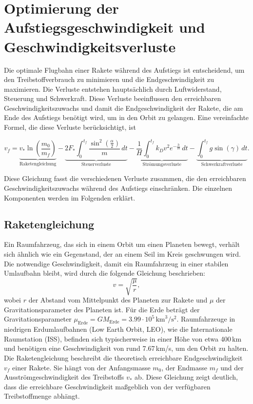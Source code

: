 %
%
%
%

\section{Optimierung der Aufstiegsgeschwindigkeit und Geschwindigkeitsverluste \label{leo:section:aufstiegsgleichung}}

Die optimale Flugbahn einer Rakete während des Aufstiegs ist entscheidend, um den Treibstoffverbrauch zu minimieren und die Endgeschwindigkeit zu maximieren. 
Die Verluste entstehen hauptsächlich durch Luftwiderstand, Steuerung und Schwerkraft. 
Diese Verluste beeinflussen den erreichbaren Geschwindigkeitszuwachs und damit die Endgeschwindigkeit der Rakete, die am Ende des Aufstiegs benötigt wird, um in den Orbit zu gelangen. 
Eine vereinfachte Formel, die diese Verluste berücksichtigt, ist

\begin{equation}
	v_f = \underbrace{v_* \ln \left(\frac{m_0}{m_f}\right)}_{\text{Raketengleichung}} 
	- \underbrace{2F_* \int_0^{t_f} \frac{\sin^2\left(\frac{\alpha}{2}\right)}{m} \, dt }_{\text{Steuerverluste}}
	- \underbrace{\frac{1}{H} \int_0^{t_f} k_Dv^2 e^{-\frac{h}{H}} \, dt }_{\text{Strömungsverluste}}
	- \underbrace{\int_0^{t_f} g \sin \left(\gamma\right) \, dt}_{\text{Schwerkraftverluste}}.
	\label{leo:aufstiegsgleichung}
\end{equation}

Diese Gleichung fasst die verschiedenen Verluste zusammen, die den erreichbaren Geschwindigkeitszuwachs während des Aufstiegs einschränken. 
Die einzelnen Komponenten werden im Folgenden erklärt.

\subsection{Raketengleichung \label{leo:section:raketengleichung}}
Ein Raumfahrzeug, das sich in einem Orbit um einen Planeten bewegt, verhält sich ähnlich wie ein Gegenstand, der an einem Seil im Kreis geschwungen wird. 
Die notwendige Geschwindigkeit, damit ein Raumfahrzeug in einer stabilen Umlaufbahn bleibt, wird durch die folgende Gleichung beschrieben:
\[
v = \sqrt{\frac{\mu}{r}},
\]
wobei \(r\) der Abstand vom Mittelpunkt des Planeten zur Rakete und \(\mu\) der Gravitationsparameter des Planeten ist.
Für die Erde beträgt der Gravitationsparameter $\mu_{\text{Erde}} = GM_{\text{Erde}} = 3.99 \cdot 10^5\,\text{km}^3/\text{s}^2$. 
Raumfahrzeuge in niedrigen Erdumlaufbahnen (Low Earth Orbit, LEO), wie die Internationale Raumstation (ISS), befinden sich typischerweise in einer Höhe von etwa 400\,km und benötigen eine Geschwindigkeit von rund 7.67\,km/s, um den Orbit zu halten.
Die Raketengleichung beschreibt die theoretisch erreichbare Endgeschwindigkeit \(v_f\) einer Rakete. 
Sie hängt von der Anfangsmasse \(m_0\), der Endmasse \(m_f\) und der Ausströmgeschwindigkeit des Treibstoffs \(v_*\) ab. 
Diese Gleichung zeigt deutlich, dass die erreichbare Geschwindigkeit maßgeblich von der verfügbaren Treibstoffmenge abhängt.

